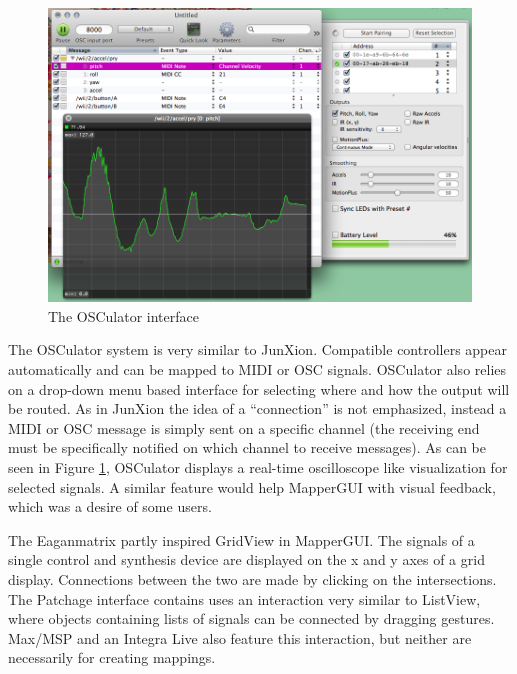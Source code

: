 \begin{figure}
	\centering
		\includegraphics[width=\textwidth]{figures/osculator}
		\caption{The OSCulator interface}
		\label{fig:osculator}
\end{figure}

The OSCulator system \cite{osculator} is very similar to JunXion. Compatible controllers appear automatically and can be mapped to MIDI or OSC signals. OSCulator also relies on a drop-down menu based interface for selecting where and how the output will be routed. As in JunXion the idea of a ``connection'' is not emphasized, instead a MIDI or OSC message is simply sent on a specific channel (the receiving end must be specifically notified on which channel to receive messages). As can be seen in Figure \ref{fig:osculator}, OSCulator displays a real-time oscilloscope like visualization for selected signals. A similar feature would help MapperGUI with visual feedback, which was a desire of some users.

The Eaganmatrix \cite{eaganmatrix} partly inspired GridView in MapperGUI. The signals of a single control and synthesis device are displayed on the x and y axes of a grid display. Connections between the two are made by clicking on the intersections. The Patchage interface \cite{patchage} contains uses an interaction very similar to ListView, where objects containing lists of signals can be connected by dragging gestures. Max/MSP and an Integra Live \cite{integra} also feature this interaction, but neither are necessarily for creating mappings. 



